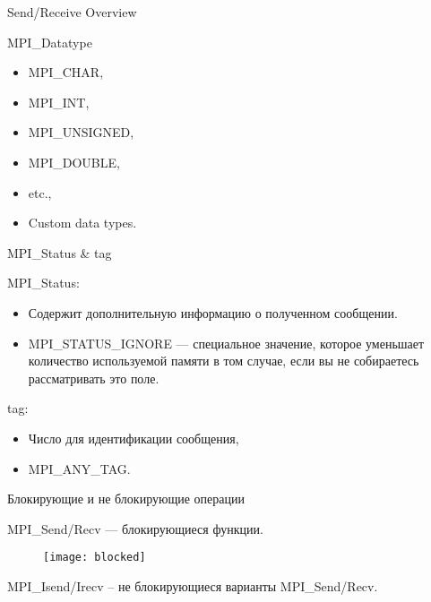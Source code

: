 \begin{frame}{Send/Receive Overview}

\sendrecv

\end{frame}

\begin{frame}{MPI_Datatype}

\begin{itemize}
	\item MPI_CHAR,
	\item MPI_INT,
	\item MPI_UNSIGNED,
	\item MPI_DOUBLE,
	\item etc.,
	\item Custom data types.
\end{itemize}

\end{frame}

\begin{frame}{MPI_Status \& tag}

MPI_Status:

\begin{itemize}
	\item Содержит дополнительную информацию о полученном сообщении.
	\item MPI_STATUS_IGNORE --- специальное значение, которое уменьшает количество используемой памяти в том случае, если вы не собираетесь рассматривать это поле.
\end{itemize}

\vfill

tag:

\begin{itemize}
	\item Число для идентификации сообщения,
	\item MPI_ANY_TAG.
\end{itemize}

\end{frame}

\begin{frame}{Блокирующие и не блокирующие операции}

MPI_Send/Recv --- блокирующиеся функции.

\begin{figure}[htp]
	\centering
	\texttt{[image: blocked]}
\end{figure}

MPI_Isend/Irecv – не блокирующиеся варианты MPI_Send/Recv.

\end{frame}

